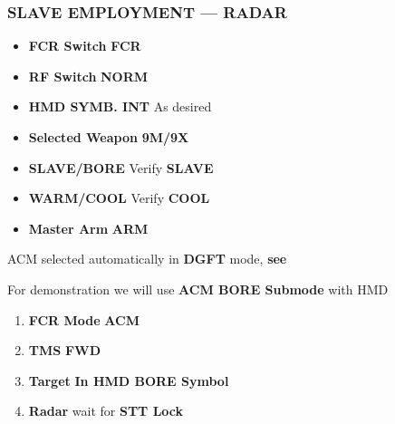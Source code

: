 \subsubsection{SLAVE EMPLOYMENT --- RADAR}
\label{subsec:aim9:slave}
\begin{checklistenumerate}
    \blueitem[Prerequisites]
    \begin{itemize}
        \item \textbf{FCR Switch} \dotfill \textbf{FCR}
        \item \textbf{RF Switch} \dotfill \textbf{NORM}
        \item \textbf{HMD SYMB. INT} \dotfill As desired
        \item \textbf{Selected Weapon} \dotfill \textbf{9M/9X}
        \item \textbf{SLAVE/BORE} \dotfill Verify \textbf{SLAVE}
        \item \textbf{WARM/COOL} \dotfill Verify \textbf{COOL}
        \item \textbf{Master Arm} \dotfill \textbf{ARM}
    \end{itemize}
    ACM selected automatically in \textbf{DGFT} mode, \textbf{see }
    
    \medskip
    For demonstration we will use \textbf{ACM BORE Submode} with HMD
    
    \begin{enumerate}
        \item \textbf{FCR Mode} \dotfill \textbf{ACM}
        \item \textbf{TMS} \dotfill \textbf{FWD}
        \item \textbf{Target} \dotfill \textbf{In HMD BORE Symbol}
        \item \textbf{Radar} \dotfill wait for \textbf{STT Lock}
    \end{enumerate}
    

\end{checklistenumerate}

